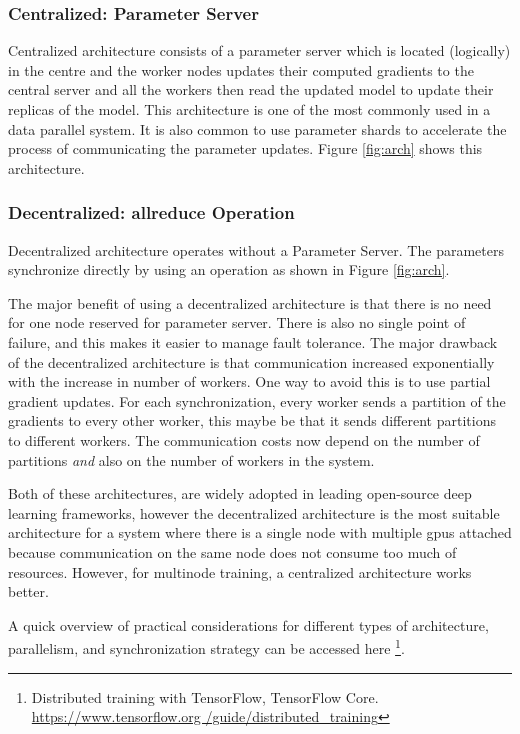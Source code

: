 \subsubsection{Centralized: Parameter Server}
Centralized architecture consists of a parameter server which is located (logically) in the centre and the worker nodes updates their computed gradients to the central server and all the workers then read the updated model to update their replicas of the model. This architecture is one of the most commonly used in a data parallel system. It is also common to use parameter shards to accelerate the process of communicating the parameter updates. Figure \ref{fig:arch} shows this architecture.

\subsubsection{Decentralized: allreduce Operation}
Decentralized architecture operates without a Parameter Server. The parameters synchronize directly by using an  operation as shown in Figure \ref{fig:arch}. 

The major benefit of using a decentralized architecture is that there is no need for one node reserved for parameter server. There is also no single point of failure, and this makes it easier to manage fault tolerance. The major drawback of the decentralized architecture is that communication increased exponentially with the increase in number of workers. One way to avoid this is to use partial gradient updates. For each synchronization, every worker sends a partition of the gradients to every other worker, this maybe be that it sends different partitions to different workers.  The communication costs now depend on the number of partitions \emph{and} also on the number of workers in the system. 

Both of these architectures, are widely adopted in leading open-source deep learning frameworks, however the decentralized architecture is the most suitable architecture for a system where there is a single node with multiple \acrshort{gpu}s attached because communication on the same node does not consume too much of resources. However, for multinode training, a centralized architecture works better\cite{Mayer2020ScalableInfrastructures}. 

A quick overview of practical considerations for different types of architecture, parallelism, and synchronization strategy can be accessed here \footnote{Distributed training with TensorFlow, TensorFlow Core. \href{https://www.tensorflow.org/guide/distributed\_training}{https://www.tensorflow.org /guide/distributed\_training} }. 

